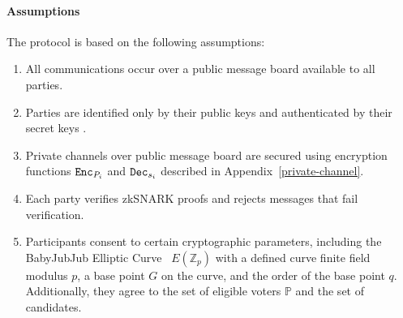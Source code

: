 \documentclass[runningheads]{llncs}
\begin{document}
\paragraph*{Assumptions}
The protocol is based on the following assumptions:
\begin{enumerate}
\item All communications occur over a public message board available to all parties.
\item Parties are identified only by their public keys  and authenticated by their secret keys .
\item Private channels over public message board are secured using encryption functions $\texttt{Enc}_{P_{i}}$ and $\texttt{Dec}_{s_{i}}$ described in Appendix~\ref{private-channel}.
\item Each party verifies zkSNARK proofs and rejects messages that fail verification.
\item Participants consent to certain cryptographic parameters, including the BabyJubJub Elliptic Curve~\cite{whitehatBabyJubjubElliptic2020} $E(\mathbb{Z}_p)$ with a defined curve finite field modulus $p$, a base point $G$ on the curve, and the order of the base point $q$. Additionally, they agree to the set of eligible voters $\mathbb{P}$ and the set of candidates.
\end{enumerate}
\end{document}

